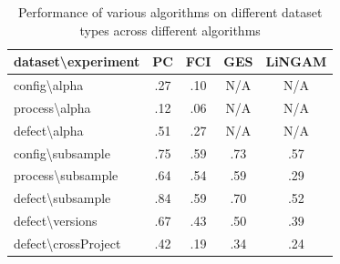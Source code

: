 \documentclass[]{svjour3}
\begin{document}
\begin{table}[]
\centering
\caption{Performance of various algorithms on different dataset types across different algorithms}
\label{Revisionalternative alg performance comparisons}
\begin{tabular}{|l|c|c|c|c|}
\hline
\textbf{dataset\textbackslash{}experiment} & \multicolumn{1}{l|}{\textbf{PC}} & \multicolumn{1}{l|}{\textbf{FCI}} & \multicolumn{1}{l|}{\textbf{GES}} & \multicolumn{1}{l|}{\textbf{LiNGAM}} \\ \hline
config\textbackslash{}alpha                & .27                              & .10                               & N/A                               & N/A                                  \\ \hline
process\textbackslash{}alpha               & \cellcolor[HTML]{FFCCC9}.12      & \cellcolor[HTML]{FFCCC9}.06       & N/A                               & N/A                                  \\ \hline
defect\textbackslash{}alpha                & \cellcolor[HTML]{9AFF99}.51      & \cellcolor[HTML]{9AFF99}.27       & N/A                               & N/A                                  \\ \hline
config\textbackslash{}subsample            & .75                              & \cellcolor[HTML]{9AFF99}.59       & \cellcolor[HTML]{9AFF99}.73       & \cellcolor[HTML]{9AFF99}.57          \\ \hline
process\textbackslash{}subsample           & \cellcolor[HTML]{FFCCC9}.64      & \cellcolor[HTML]{FFCCC9}.54       & \cellcolor[HTML]{FFCCC9}.59       & \cellcolor[HTML]{FFCCC9}.29          \\ \hline
defect\textbackslash{}subsample            & \cellcolor[HTML]{9AFF99}.84      & \cellcolor[HTML]{9AFF99}.59       & .70                               & .52                                  \\ \hline
defect\textbackslash{}versions             & .67                              & .43                               & .50                               & .39                                  \\ \hline
defect\textbackslash{}crossProject         & .42                              & .19                               & .34                               & .24                                  \\ \hline
\end{tabular}
\end{table}
\end{document}
